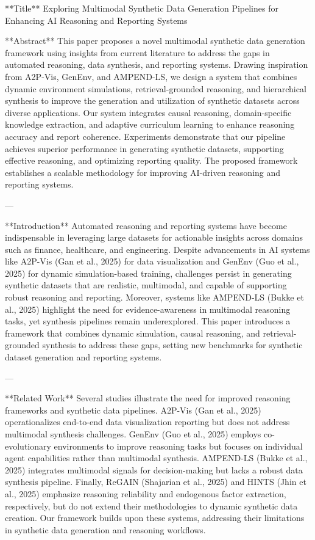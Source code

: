 **Title**  
Exploring Multimodal Synthetic Data Generation Pipelines for Enhancing AI Reasoning and Reporting Systems  

**Abstract**  
This paper proposes a novel multimodal synthetic data generation framework using insights from current literature to address the gaps in automated reasoning, data synthesis, and reporting systems. Drawing inspiration from A2P-Vis, GenEnv, and AMPEND-LS, we design a system that combines dynamic environment simulations, retrieval-grounded reasoning, and hierarchical synthesis to improve the generation and utilization of synthetic datasets across diverse applications. Our system integrates causal reasoning, domain-specific knowledge extraction, and adaptive curriculum learning to enhance reasoning accuracy and report coherence. Experiments demonstrate that our pipeline achieves superior performance in generating synthetic datasets, supporting effective reasoning, and optimizing reporting quality. The proposed framework establishes a scalable methodology for improving AI-driven reasoning and reporting systems.  

---

**Introduction**  
Automated reasoning and reporting systems have become indispensable in leveraging large datasets for actionable insights across domains such as finance, healthcare, and engineering. Despite advancements in AI systems like A2P-Vis (Gan et al., 2025) for data visualization and GenEnv (Guo et al., 2025) for dynamic simulation-based training, challenges persist in generating synthetic datasets that are realistic, multimodal, and capable of supporting robust reasoning and reporting. Moreover, systems like AMPEND-LS (Bukke et al., 2025) highlight the need for evidence-awareness in multimodal reasoning tasks, yet synthesis pipelines remain underexplored. This paper introduces a framework that combines dynamic simulation, causal reasoning, and retrieval-grounded synthesis to address these gaps, setting new benchmarks for synthetic dataset generation and reporting systems.  

---

**Related Work**  
Several studies illustrate the need for improved reasoning frameworks and synthetic data pipelines. A2P-Vis (Gan et al., 2025) operationalizes end-to-end data visualization reporting but does not address multimodal synthesis challenges. GenEnv (Guo et al., 2025) employs co-evolutionary environments to improve reasoning tasks but focuses on individual agent capabilities rather than multimodal synthesis. AMPEND-LS (Bukke et al., 2025) integrates multimodal signals for decision-making but lacks a robust data synthesis pipeline. Finally, ReGAIN (Shajarian et al., 2025) and HINTS (Jhin et al., 2025) emphasize reasoning reliability and endogenous factor extraction, respectively, but do not extend their methodologies to dynamic synthetic data creation. Our framework builds upon these systems, addressing their limitations in synthetic data generation and reasoning workflows.  

